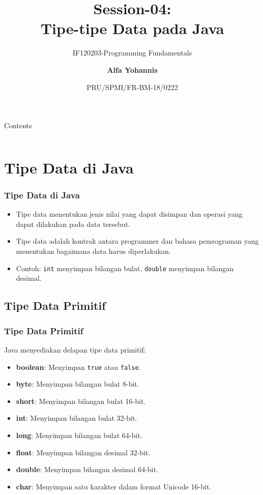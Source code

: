 \documentclass[aspectratio=169, table]{beamer}
\subtitle{IF120203-Programming Fundamentals}
\title{Session-04:\\\LARGE{Tipe-tipe Data pada Java\\}
\vspace{10pt}}
\date[Serial]{\scriptsize {PRU/SPMI/FR-BM-18/0222}}
\author[Pradita]{\small{\textbf{Alfa Yohannis}}}
\begin{document}
\frame{\titlepage}

\begin{frame}[fragile]{Contents}
\vspace{15pt}
\begin{columns}[t]
\begin{column}{.5\textwidth}
	\tableofcontents[sections={1-8}]
\end{column}
\begin{column}{.5\textwidth}
	\tableofcontents[sections={9-20}]
\end{column}
\end{columns}
\end{frame}

\section{Tipe Data di Java}

\begin{frame}[fragile]
	\frametitle{Tipe Data di Java}
	\begin{itemize}
		\item Tipe data menentukan jenis nilai yang dapat disimpan dan operasi yang dapat dilakukan pada data tersebut.
		\item Tipe data adalah kontrak antara programmer dan bahasa pemrograman yang menentukan bagaimana data harus diperlakukan.
		\item Contoh: \texttt{int} menyimpan bilangan bulat, \texttt{double} menyimpan bilangan desimal.
	\end{itemize}
\end{frame}

\subsection{Tipe Data Primitif}
\begin{frame}[fragile]
	\frametitle{Tipe Data Primitif}
	Java menyediakan delapan tipe data primitif:
	\begin{itemize}
		\item \textbf{boolean}: Menyimpan \texttt{true} atau \texttt{false}.
		\item \textbf{byte}: Menyimpan bilangan bulat 8-bit.
		\item \textbf{short}: Menyimpan bilangan bulat 16-bit.
		\item \textbf{int}: Menyimpan bilangan bulat 32-bit.
		\item \textbf{long}: Menyimpan bilangan bulat 64-bit.
		\item \textbf{float}: Menyimpan bilangan desimal 32-bit.
		\item \textbf{double}: Menyimpan bilangan desimal 64-bit.
		\item \textbf{char}: Menyimpan satu karakter dalam format Unicode 16-bit.
	\end{itemize}
\end{frame}
\end{document}
